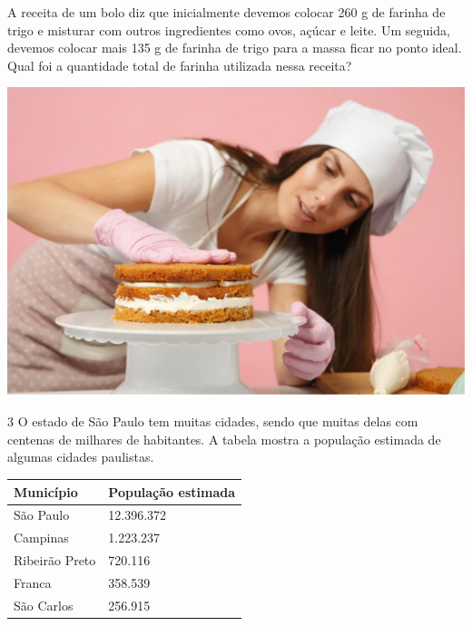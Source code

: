 \begin{minipage}{.5\textwidth}
A receita de um bolo diz que inicialmente devemos colocar 260 g de
farinha de trigo e misturar com outros ingredientes como ovos, açúcar e
leite. Um seguida, devemos colocar mais 135 g de farinha de trigo para a
massa ficar no ponto ideal. Qual foi a quantidade total de farinha
utilizada nessa receita?
\end{minipage}\hspace{.5cm}
\begin{minipage}{.5\textwidth}
\includegraphics[width=\textwidth]{./imgs/mat2.png}
\end{minipage}



\pagebreak
\num{3} O estado de São Paulo tem muitas cidades, sendo que muitas delas com
centenas de milhares de habitantes. A tabela mostra a população estimada
de algumas cidades paulistas.

\begin{longtable}[]{@{}ll@{}}
\toprule
Município & População estimada\tabularnewline
\midrule
\endhead
São Paulo & 12.396.372\tabularnewline
Campinas & 1.223.237\tabularnewline
Ribeirão Preto & 720.116\tabularnewline
Franca & 358.539\tabularnewline
São Carlos & 256.915\tabularnewline
\bottomrule
\end{longtable}


